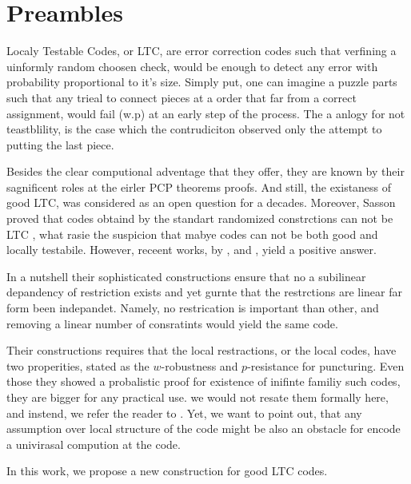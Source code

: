 \section{Preambles}

Localy Testable Codes, or LTC, are error correction codes such that verfining a uinformly random choosen check, would be enough to detect any error with probability proportional to it's size. Simply put, one can imagine a puzzle parts such that any trieal to connect pieces at a order that far from a correct assignment, would fail (w.p) at an early step of the process. The a anlogy for not teastblility, is the case which the contrudiciton observed only the attempt to putting the last piece.     

Besides the clear computional adventage that they offer, they are known by their sagnificent roles at the eirler PCP theorems proofs. And still, the existaness of good LTC, was considered as an open question for a decades. Moreover, Sasson proved that codes obtaind by the standart randomized constrctions can not be LTC \cite{Sasson}, what rasie the suspicion that mabye codes can not be both good and locally testabile. However, receent works, by \cite{Dinur}, \cite{Pavel} and \cite{leverrier2022quantum}, yield a positive answer.

In a nutshell their sophisticated constructions ensure that no a subilinear depandency of restriction exists and yet gurnte that the restrctions are linear far form been indepandet. Namely, no restrication is important than other, and removing a linear number of consratints would yield the same code.  

Their constructions requires that the local restractions, or the local codes, have two properities, stated as the $w$-robustness and $p$-resistance for puncturing. Even those they showed a probalistic proof for existence of inifinte familiy such codes, they are bigger for any practical use. we would not resate them formally here, and instend, we refer the reader to \cite{leverrier2022quantum}. Yet, we want to point out, that any assumption over local structure of the code might be also an obstacle for encode a univirasal compution at the code. 

In this work, we propose a new construction for good LTC codes. 
